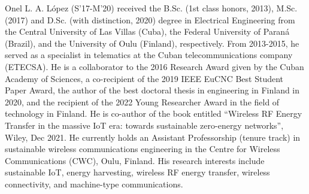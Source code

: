  \begin{IEEEbiography}
 { Onel L. A. López} (S'17-M'20) received the B.Sc. (1st class honors, 2013), M.Sc. (2017) and D.Sc. (with distinction, 2020) degree in Electrical Engineering from the Central University of Las Villas (Cuba),  the Federal University of Paraná (Brazil), and the University of Oulu (Finland), respectively. From 2013-2015, he served as a specialist in telematics at the Cuban telecommunications company (ETECSA). He is a collaborator to the 2016 Research Award given by the Cuban Academy of Sciences, a co-recipient of the 2019 IEEE EuCNC Best Student Paper Award, the author of the best doctoral thesis in engineering in Finland in 2020, and the recipient of the 2022 Young Researcher Award in the field of technology in Finland. He is co-author of the book entitled ``Wireless RF Energy Transfer in the massive IoT era: towards sustainable zero-energy networks'', Wiley, Dec 2021. He currently holds an Assistant Professorship (tenure track) in sustainable wireless communications engineering in the Centre for Wireless Communications (CWC), Oulu, Finland. His research interests include sustainable IoT, energy harvesting, wireless RF energy transfer, wireless connectivity, and machine-type communications.
 \end{IEEEbiography}

